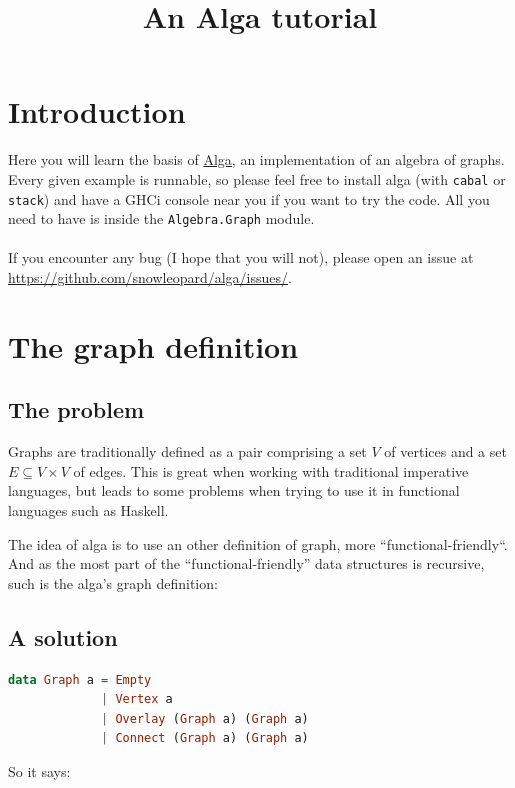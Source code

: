 \documentclass[10pt,a4paper]{article}
\title{An Alga tutorial}
\date{}
\begin{document}
\maketitle
\tableofcontents
\section{Introduction}

Here you will learn the basis of \href{http://hackage.haskell.org/package/algebraic-graphs}{Alga}, an implementation of an algebra of graphs.
Every given example is runnable, so please feel free to install alga (with \verb|cabal| or \verb|stack|) and have a GHCi console near you if you want to try the code. All you need to have is inside the \verb|Algebra.Graph| module.
\\
\\
If you encounter any bug (I hope that you will not), please open an issue at \url{https://github.com/snowleopard/alga/issues/}.

\section{The graph definition}
\subsection{The problem}
Graphs are traditionally defined as a pair comprising a set $V$ of vertices and a set $E \subseteq V \times V$ of edges. This is great when working with traditional imperative languages, but leads to some problems when trying to use it in functional languages such as Haskell.

The idea of alga is to use an other definition of graph, more ``functional-friendly``. And as the most part of the ``functional-friendly” data structures is recursive, such is the alga’s graph definition:

\subsection{A solution}
\begin{lstlisting}[language=Haskell, frame=single]
data Graph a = Empty
             | Vertex a
             | Overlay (Graph a) (Graph a)
             | Connect (Graph a) (Graph a)
\end{lstlisting}

So it says:
\end{document}
